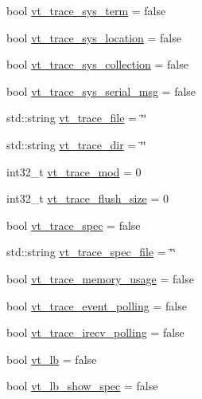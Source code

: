 \begin{DoxyCompactItemize}
\item 
bool \hyperlink{structvt_1_1arguments_1_1_app_config_a723e9f8cd1422d47d0294dcb951261f7}{vt\+\_\+trace\+\_\+sys\+\_\+term} = false
\item 
bool \hyperlink{structvt_1_1arguments_1_1_app_config_a91260efaad41abe7d191ba4771b45785}{vt\+\_\+trace\+\_\+sys\+\_\+location} = false
\item 
bool \hyperlink{structvt_1_1arguments_1_1_app_config_a50becf5c6101368f5d9c6884e190fed3}{vt\+\_\+trace\+\_\+sys\+\_\+collection} = false
\item 
bool \hyperlink{structvt_1_1arguments_1_1_app_config_a50afef339e662908db55e0d60bde2d40}{vt\+\_\+trace\+\_\+sys\+\_\+serial\+\_\+msg} = false
\item 
std\+::string \hyperlink{structvt_1_1arguments_1_1_app_config_ad445cf8321e97a3e5da0fa7923690fa8}{vt\+\_\+trace\+\_\+file} = \char`\"{}\char`\"{}
\item 
std\+::string \hyperlink{structvt_1_1arguments_1_1_app_config_a05efd2295aa43237c029cc2b24f0e788}{vt\+\_\+trace\+\_\+dir} = \char`\"{}\char`\"{}
\item 
int32\+\_\+t \hyperlink{structvt_1_1arguments_1_1_app_config_afa2e36bf17ed46ca812263f523533353}{vt\+\_\+trace\+\_\+mod} = 0
\item 
int32\+\_\+t \hyperlink{structvt_1_1arguments_1_1_app_config_a537883e43e43508431626e90886edd92}{vt\+\_\+trace\+\_\+flush\+\_\+size} = 0
\item 
bool \hyperlink{structvt_1_1arguments_1_1_app_config_ade1d955e557ed03865dbb4317bb69c22}{vt\+\_\+trace\+\_\+spec} = false
\item 
std\+::string \hyperlink{structvt_1_1arguments_1_1_app_config_abd5bcb7a9ca53be8eafc28e2cbd18290}{vt\+\_\+trace\+\_\+spec\+\_\+file} = \char`\"{}\char`\"{}
\item 
bool \hyperlink{structvt_1_1arguments_1_1_app_config_a39c140474cc43ea0d8bca36359ffd86a}{vt\+\_\+trace\+\_\+memory\+\_\+usage} = false
\item 
bool \hyperlink{structvt_1_1arguments_1_1_app_config_a43da3e179ed4ad72411a41b46fae97e0}{vt\+\_\+trace\+\_\+event\+\_\+polling} = false
\item 
bool \hyperlink{structvt_1_1arguments_1_1_app_config_a7753691852b0b5475c953789173cf555}{vt\+\_\+trace\+\_\+irecv\+\_\+polling} = false
\item 
bool \hyperlink{structvt_1_1arguments_1_1_app_config_a7f1564af24349d7f524f7b509d92fd22}{vt\+\_\+lb} = false
\item 
bool \hyperlink{structvt_1_1arguments_1_1_app_config_aeec1d5697a4bfc5af3a8b763b88ae964}{vt\+\_\+lb\+\_\+show\+\_\+spec} = false

\end{DoxyCompactItemize}
